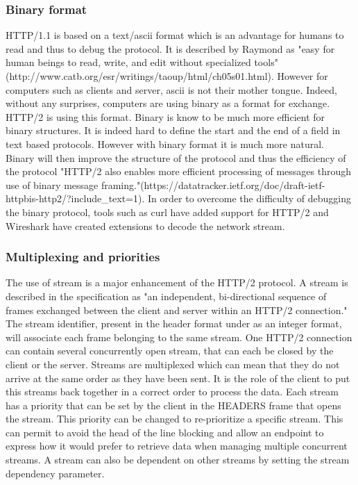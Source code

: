 \subsubsection{Binary format}
HTTP/1.1 is based on a text/ascii format which is an advantage for humans to read and thus to debug the protocol. It is described by Raymond as "easy for human beings to read, write, and edit without specialized tools"(http://www.catb.org/esr/writings/taoup/html/ch05s01.html). However for computers such as clients and server, ascii is not their mother tongue. Indeed, without any surprises, computers are using binary as a format for exchange. HTTP/2 is using this format.
Binary is know to be much more efficient for binary structures. It is indeed hard to define the start and the end of a field in text based protocols. However with binary format it is much more natural. Binary will then improve the structure of the protocol and thus the efficiency of the protocol "HTTP/2 also enables more efficient processing of messages through use of binary message framing."(https://datatracker.ietf.org/doc/draft-ietf-httpbis-http2/?include\_text=1). In order to overcome the difficulty of debugging the binary protocol, tools such as curl have added support for HTTP/2 and Wireshark have created extensions to decode the network stream.

\subsubsection{Multiplexing and priorities}
The use of stream is a major enhancement of the HTTP/2 protocol. A stream is described in the specification as "an independent, bi-directional sequence of frames exchanged between the client and server within an HTTP/2 connection." The stream identifier, present in the header format under as an integer format, will associate each frame belonging to the same stream. One HTTP/2 connection can contain several concurrently open stream, that can each be closed by the client or the server. Streams are multiplexed which can mean that they do not arrive at the same order as they have been sent. It is the role of the client to put this streams back together in a correct order to process the data. 
Each stream has a priority that can be set by the client in the HEADERS frame that opens the stream. This priority can be changed to re-prioritize a specific stream. This can permit to avoid the head of the line blocking and allow an endpoint to express how it would prefer to retrieve data when managing multiple concurrent streams.  A stream can also be dependent on other streams by setting the stream dependency parameter.

